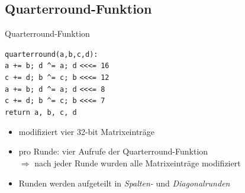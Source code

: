 \documentclass{beamer}
\begin{document}
\subsection{Quarterround-Funktion}
\begin{frame}[fragile]{Quarterround-Funktion}
\begin{center}
\begin{minipage}{0.5\linewidth}
\texttt{quarterround(a,b,c,d):} \\
\hspace*{2em}\texttt{a += b; d  \^{}= a; d} \verb|<<<|\texttt{= 16} \\
\hspace*{2em}\texttt{c += d; b \^{}= c; b} \verb|<<<|\texttt{= 12} \\
\hspace*{2em}\texttt{a += b; d \^{}= a; d} \verb|<<<|\texttt{= 8} \\
\hspace*{2em}\texttt{c += d; b \^{}= c; b} \verb|<<<|\texttt{= 7} \\
\hspace*{2em}\texttt{return a, b, c, d}
\end{minipage}
\end{center}
\begin{itemize}
\item modifiziert vier 32-bit Matrixeinträge
\item pro Runde: vier Aufrufe der Quarterround-Funktion \\
$\Rightarrow$ nach jeder Runde wurden alle Matrixeinträge modifiziert
\item Runden werden aufgeteilt in \textit{Spalten-} und \textit{Diagonalrunden}
\end{itemize}
\end{frame}
\end{document}

